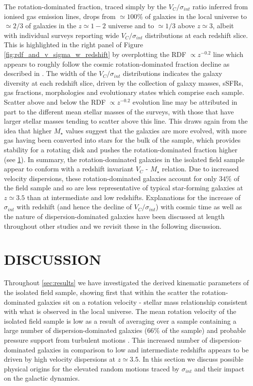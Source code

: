 \documentclass[fleqn,usenatbib]{mnras}
\begin{document}
The rotation-dominated fraction, traced simply by the $V_{C}/\sigma_{int}$ ratio inferred from ionised gas emission lines, drops from $\simeq100\%$ of galaxies in the local universe to $\simeq2/3$ of galaxies in the $z\simeq1-2$ universe and to $\simeq1/3$ above $z\simeq3$, albeit with individual surveys reporting wide $V_{C}/\sigma_{int}$ distributions at each redshift slice.
This is highlighted in the right panel of Figure \ref{fig:rdf_and_v_sigma_w_redshift} by overplotting the RDF $\propto z^{-0.2}$ line which appears to roughly follow the cosmic rotation-dominated fraction decline as described in \cite{Stott2016}. 
The width of the $V_{C}/\sigma_{int}$ distributions indicates the galaxy diversity at each redshift slice, driven by the collection of galaxy masses, sSFRs, gas fractions, morphologies and evolutionary states which comprise each sample.
Scatter above and below the RDF $\propto z^{-0.2}$ evolution line may be attributed in part to the different mean stellar masses of the surveys, with those that have larger stellar masses tending to scatter above this line.
This draws again from the idea that higher $M_{\star}$ values suggest that the galaxies are more evolved, with more gas having been converted into stars for the bulk of the sample, which provides stability for a rotating disk and pushes the rotation-dominated fraction higher (see \cref{sec:discussion}).
In summary, the rotation-dominated galaxies in the isolated field sample appear to conform with a redshift invariant $V_{C}$ - $M_{\star}$ relation.
Due to increased velocity dispersions, these rotation-dominated galaxies account for only $34\%$ of the field sample and so are less representative of typical star-forming galaxies at $z\simeq3.5$ than at intermediate and low redshifts. 
Explanations for the increase of $\sigma_{int}$ with redshift (and hence the decline of $V_{C}/\sigma_{int}$) with cosmic time as well as the nature of dispersion-dominated galaxies have been discussed at length throughout other studies \citep[e.g][]{ForsterSchreiber2009,Law2009,Burkert2010,Newman2013,Wisnioski2015} and we revisit these in the following discussion.

\section{DISCUSSION}\label{sec:discussion}

Throughout \cref{sec:results} we have investigated the derived kinematic parameters of the isolated field sample, showing first that within the scatter the rotation-dominated galaxies sit on a rotation velocity - stellar mass relationship consistent with what is observed in the local universe.
The mean rotation velocity of the isolated field sample is low as a result of averaging over a sample containing a large number of dispersion-dominated galaxies ($66\%$ of the sample) and probable pressure support from turbulent motions \citep[e.g.][]{Burkert2010}.
This increased number of dispersion-dominated galaxies in comparison to low and intermediate redshifts appears to be driven by high velocity dispersions at $z\simeq3.5$.
In this section we discuss possible physical origins for the elevated random motions traced by $\sigma_{int}$ and their impact on the galactic dynamics.
\end{document}
